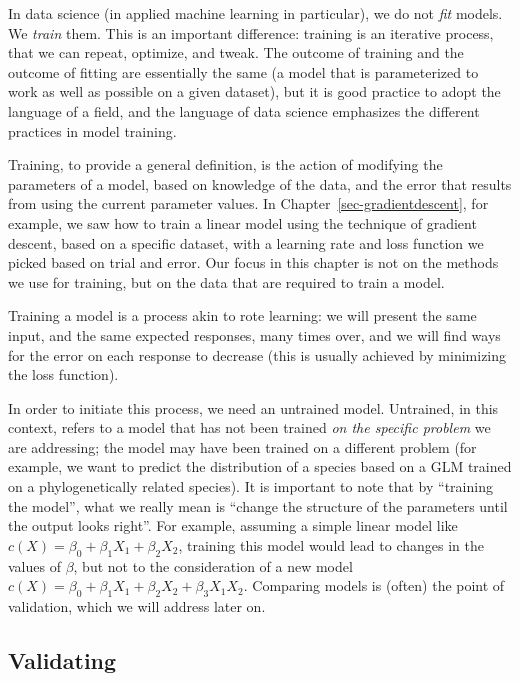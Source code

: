 \documentclass[
  letterpaper,
]{scrbook}
\begin{document}
In data science (in applied machine learning in particular), we do not
\emph{fit} models. We \emph{train} them. This is an important
difference: training is an iterative process, that we can repeat,
optimize, and tweak. The outcome of training and the outcome of fitting
are essentially the same (a model that is parameterized to work as well
as possible on a given dataset), but it is good practice to adopt the
language of a field, and the language of data science emphasizes the
different practices in model training.

Training, to provide a general definition, is the action of modifying
the parameters of a model, based on knowledge of the data, and the error
that results from using the current parameter values. In
Chapter~\ref{sec-gradientdescent}, for example, we saw how to train a
linear model using the technique of gradient descent, based on a
specific dataset, with a learning rate and loss function we picked based
on trial and error. Our focus in this chapter is not on the methods we
use for training, but on the data that are required to train a model.

Training a model is a process akin to rote learning: we will present the
same input, and the same expected responses, many times over, and we
will find ways for the error on each response to decrease (this is
usually achieved by minimizing the loss function).

In order to initiate this process, we need an untrained model.
Untrained, in this context, refers to a model that has not been trained
\emph{on the specific problem} we are addressing; the model may have
been trained on a different problem (for example, we want to predict the
distribution of a species based on a GLM trained on a phylogenetically
related species). It is important to note that by ``training the
model'', what we really mean is ``change the structure of the parameters
until the output looks right''. For example, assuming a simple linear
model like \(c(X) = \beta_0 + \beta_1X_1 + \beta_2X_2\), training this
model would lead to changes in the values of \(\beta\), but not to the
consideration of a new model
\(c(X) = \beta_0 + \beta_1X_1 + \beta_2X_2 + \beta_3X_1X_2\). Comparing
models is (often) the point of validation, which we will address later
on.

\subsection{Validating}\label{validating}
\end{document}
